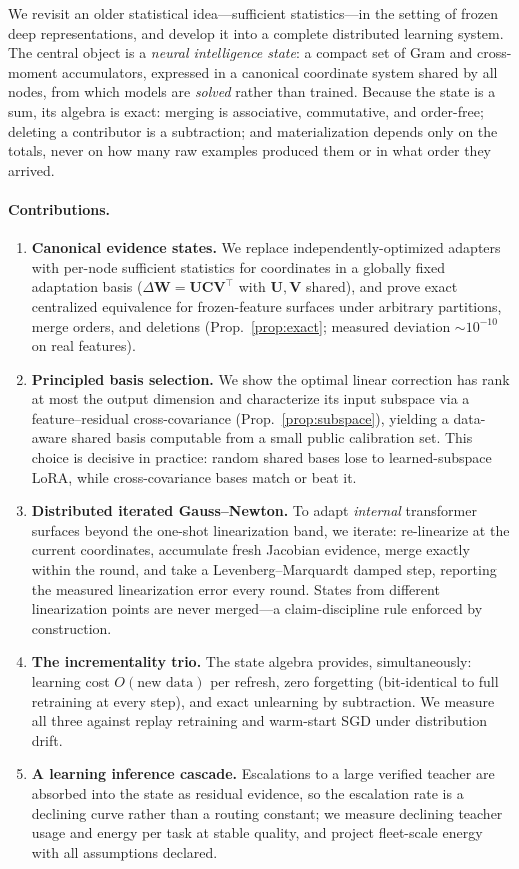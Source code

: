 \documentclass[11pt]{article}
\newcommand{\bW}{\mathbf{W}}
\newcommand{\bC}{\mathbf{C}}
\begin{document}
We revisit an older statistical idea---sufficient statistics---in the
setting of frozen deep representations, and develop it into a complete
distributed learning system. The central object is a \emph{neural
intelligence state}: a compact set of Gram and cross-moment accumulators,
expressed in a canonical coordinate system shared by all nodes, from
which models are \emph{solved} rather than trained. Because the state is
a sum, its algebra is exact: merging is associative, commutative, and
order-free; deleting a contributor is a subtraction; and materialization
depends only on the totals, never on how many raw examples produced them
or in what order they arrived.

\paragraph{Contributions.}
\begin{enumerate}
  \item \textbf{Canonical evidence states.} We replace
  independently-optimized adapters with per-node sufficient statistics
  for coordinates in a globally fixed adaptation basis
  ($\Delta\bW=\mathbf{U}\bC\mathbf{V}^\top$ with $\mathbf{U},\mathbf{V}$
  shared), and prove exact centralized equivalence for frozen-feature
  surfaces under arbitrary partitions, merge orders, and deletions
  (Prop.~\ref{prop:exact}; measured deviation $\sim\!10^{-10}$ on real
  features).
  \item \textbf{Principled basis selection.} We show the optimal linear
  correction has rank at most the output dimension and characterize its
  input subspace via a feature--residual cross-covariance
  (Prop.~\ref{prop:subspace}), yielding a data-aware shared basis
  computable from a small public calibration set. This choice is
  decisive in practice: random shared bases lose to learned-subspace
  LoRA, while cross-covariance bases match or beat it.
  \item \textbf{Distributed iterated Gauss--Newton.} To adapt
  \emph{internal} transformer surfaces beyond the one-shot linearization
  band, we iterate: re-linearize at the current coordinates, accumulate
  fresh Jacobian evidence, merge exactly within the round, and take a
  Levenberg--Marquardt damped step, reporting the measured linearization
  error every round. States from different linearization points are
  never merged---a claim-discipline rule enforced by construction.
  \item \textbf{The incrementality trio.} The state algebra provides,
  simultaneously: learning cost $O(\text{new data})$ per refresh, zero
  forgetting (bit-identical to full retraining at every step), and exact
  unlearning by subtraction. We measure all three against replay
  retraining and warm-start SGD under distribution drift.
  \item \textbf{A learning inference cascade.} Escalations to a large
  verified teacher are absorbed into the state as residual evidence, so
  the escalation rate is a declining curve rather than a routing
  constant; we measure declining teacher usage and energy per task at
  stable quality, and project fleet-scale energy with all assumptions
  declared.
\end{enumerate}
\end{document}
